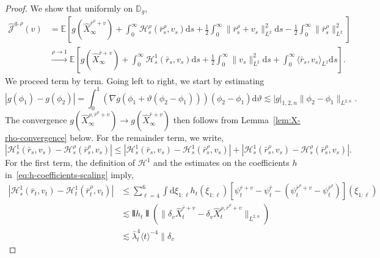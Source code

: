 \documentclass[11pt, a4paper]{scrartcl}
\numberwithin{equation}{section}
\theoremstyle{plain}
\theoremstyle{remark}
\newcommand{\mathd}{\mathrm{d}}
\newcommand{\tmtextit}[1]{\text{{\itshape{#1}}}}
\begin{document}
\begin{proof}
	\tmtextit{Convergence:} We show that uniformly on $\mathbb{D}_g$,
	\[ \begin{aligned}
			\hat{\mathcal{J}}^{g, \rho} (v) & = \mathbb{E} \left[ g
				(\hat{X}_{\infty}^{\bar{r}^{\rho} + v}) + \int_0^{\infty}
				\mathcal{H}_s^{\rho} (\bar{r}^{\rho}_s, v_s) \mathd s + \frac{1}{2}
				\int_0^{\infty} \| \bar{r}^{\rho}_s + v_s \|^2_{L^2} \mathd s -
			\frac{1}{2} \int_0^{\infty} \| \bar{r}^{\rho}_s \|^2_{L^2} \right]                                   \\
			                                & \overset{\rho \rightarrow 1}{\longrightarrow}  \mathbb{E} \left[ g
				(\hat{X}_{\infty}^{\bar{r} + v}) + \int_0^{\infty} \mathcal{H}_s^1
				(\bar{r}_s, v_s) \mathd s + \frac{1}{2} \int_0^{\infty} \| v_s
				\|^2_{L^2} \mathd s + \int_0^{\infty} \langle \bar{r}_s, v_s
				\rangle_{L^2} \mathd s \right] .
		\end{aligned} \]
	We proceed term by term. Going left to right, we start by estimating
	\[ | g (\phi_1) - g (\phi_2) | = \int_0^1 (\nabla g (\phi_1 + \vartheta
		(\phi_2 - \phi_1))) (\phi_2 - \phi_1) \mathd \vartheta \lesssim | g |_{1,
				2, n} \| \phi_2 - \phi_1 \|_{L^{2, n}} . \]
	The convergence $g (\hat{X}_{\infty}^{\rho, \bar{r}^{\rho} + v}) \rightarrow
		g (\hat{X}_{\infty}^{\bar{r} + v})$ then follows from
	Lemma~\ref{lem:X-rho-convergence} below. For the remainder term, we write,
	\[ | \mathcal{H}_s^1 (\bar{r}_s, v_s) -\mathcal{H}_s^{\rho}
		(\bar{r}^{\rho}_s, v_s) | \leqslant | \mathcal{H}_s^1 (\bar{r}_s, v_s)
		-\mathcal{H}_s^1 (\bar{r}^{\rho}_s, v_s) | + | \mathcal{H}_s^1
		(\bar{r}^{\rho}_s, v_s) -\mathcal{H}_s^{\rho} (\bar{r}^{\rho}_s, v_s) | .
	\]
	For the first term, the definition of $\mathcal{H}^1$ and the estimates on
	the coefficients $h$ in~\eqref{eq:h-coefficients-scaling} imply,
	\[ \begin{aligned}
			| \mathcal{H}_s^1 (\bar{r}_t, v_t) -\mathcal{H}_t^1 (\bar{r}^{\rho}_t,
			v_t) | & \leqslant  \sum_{\ell = 4}^6 \int \mathd \xi_{1 : \ell} h_t
			(\xi_{1 : \ell}) [\psi^{\bar{r} + v}_t - \psi^{\bar{r}}_t -
					(\psi^{\bar{r}^{\rho} + v}_t - \psi^{\bar{r}^{\rho}}_t)] (\xi_{1 :
			\ell})                                                                   \\
			       & \lesssim  \interleave h_t \interleave (\| \delta_v
			\hat{X}_t^{\bar{r} + v} - \delta_v  \hat{X}_t^{\rho, \bar{r}^{\rho} +
			v} \|_{L^{2, n}})                                                        \\
			       & \lesssim  \bar{\lambda}_t^4 \langle t \rangle^{- 4} \| \delta_v

\end{aligned}\]
\end{proof}
\end{document}
